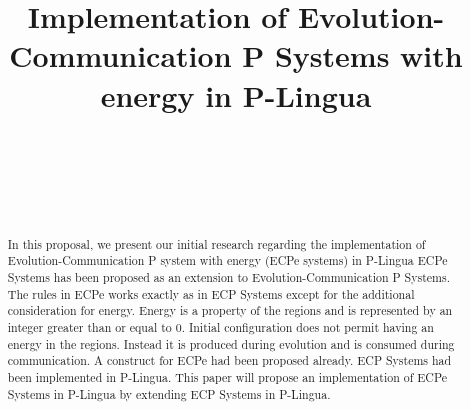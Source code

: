 \documentclass{acm_proc_article-sp}
\begin{document}
\title{Implementation of Evolution-Communication P Systems with energy in P-Lingua}

	\author{
		\\
		\\
		 \\
		 \\
		{
				}
}

\maketitle

\begin{abstract}
		In this proposal, we present our initial research regarding the implementation of Evolution-Communication P system with energy (ECPe systems) in P-Lingua
       ECPe Systems has been proposed as an extension to Evolution-Communication P Systems. The rules in ECPe works exactly as in ECP Systems except for the additional consideration for energy. Energy is a property of the regions and is represented by an integer greater than or equal to 0. Initial configuration does not permit having an energy in the regions. Instead it is produced during evolution and is consumed during communication.
\indent A construct for ECPe had been proposed already. ECP Systems had been implemented in P-Lingua. This paper will propose an implementation of ECPe Systems in P-Lingua by extending ECP Systems in P-Lingua.
       \end{abstract}
\end{document}
